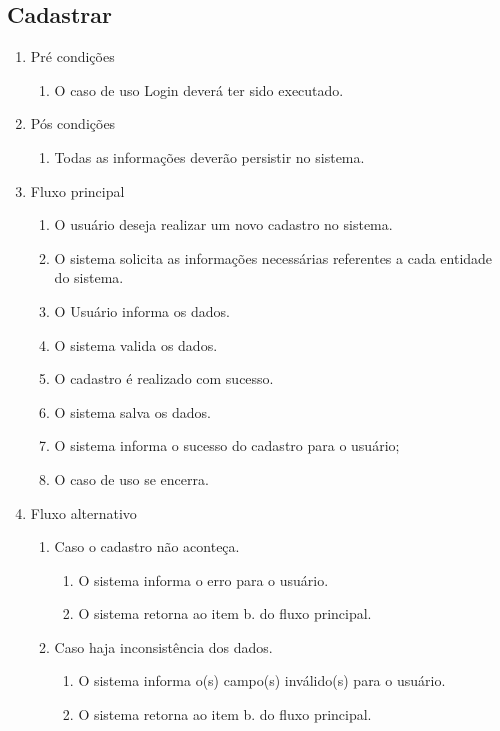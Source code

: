 \subsection{Cadastrar}
\begin{enumerate}
	\item Pré condições
	\begin{enumerate}
		\item O caso de uso Login deverá ter sido executado.
	\end{enumerate}
	\item Pós condições
	\begin{enumerate}
		\item Todas as informações deverão persistir no sistema.
	\end{enumerate}
	\item Fluxo principal
	\begin{enumerate}
		\item O usuário deseja realizar um novo cadastro no sistema.
		\item O sistema solicita as informações necessárias referentes a cada entidade do sistema.
		\item O Usuário informa os dados.
		\item O sistema valida os dados.
		\item O cadastro é realizado com sucesso.
		\item O sistema salva os dados.
		\item O sistema informa o sucesso do cadastro para o usuário;
		\item O caso de uso se encerra.
	\end{enumerate}
	\item Fluxo alternativo
	\begin{enumerate}
		\item Caso o cadastro não aconteça.
		\begin{enumerate}
			\item O sistema informa o erro para o usuário.
			\item O sistema retorna ao item b. do fluxo principal.
		\end{enumerate}
		\item Caso haja inconsistência dos dados.
		\begin{enumerate}
			\item O sistema informa o(s) campo(s) inválido(s) para o usuário.
			\item O sistema retorna ao item b. do fluxo principal.
		\end{enumerate}		
	\end{enumerate}
\end{enumerate}

